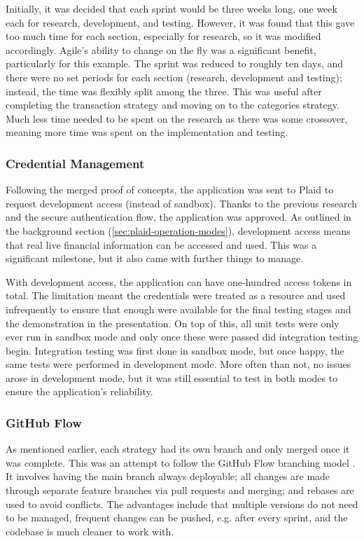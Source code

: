Initially, it was decided that each sprint would be three weeks long, one week each for research, development, and testing. However, it was found that this gave too much time for each section, especially for research, so it was modified accordingly. Agile's ability to change on the fly was a significant benefit, particularly for this example. The sprint was reduced to roughly ten days, and there were no set periods for each section (research, development and testing); instead, the time was flexibly split among the three. This was useful after completing the transaction strategy and moving on to the categories strategy. Much less time needed to be spent on the research as there was some crossover, meaning more time was spent on the implementation and testing.

\subsubsection{Credential Management}
Following the merged proof of concepts, the application was sent to Plaid to request development access (instead of sandbox). Thanks to the previous research and the secure authentication flow, the application was approved. As outlined in the background section (\ref{sec:plaid-operation-modes}), development access means that real live financial information can be accessed and used. This was a significant milestone, but it also came with further things to manage.

With development access, the application can have one-hundred access tokens in total. The limitation meant the credentials were treated as a resource and used infrequently to ensure that enough were available for the final testing stages and the demonstration in the presentation. On top of this, all unit tests were only ever run in sandbox mode and only once these were passed did integration testing begin. Integration testing was first done in sandbox mode, but once happy, the same tests were performed in development mode. More often than not, no issues arose in development mode, but it was still essential to test in both modes to ensure the application's reliability.


\subsubsection{GitHub Flow}
\label{sec:github-flow}
As mentioned earlier, each strategy had its own branch and only merged once it was complete. This was an attempt to follow the GitHub Flow branching model \cite{GitHubFlow}. It involves having the main branch always deployable; all changes are made through separate feature branches via pull requests and merging; and rebases are used to avoid conflicts. The advantages include that multiple versions do not need to be managed, frequent changes can be pushed, e.g. after every sprint, and the codebase is much cleaner to work with.

